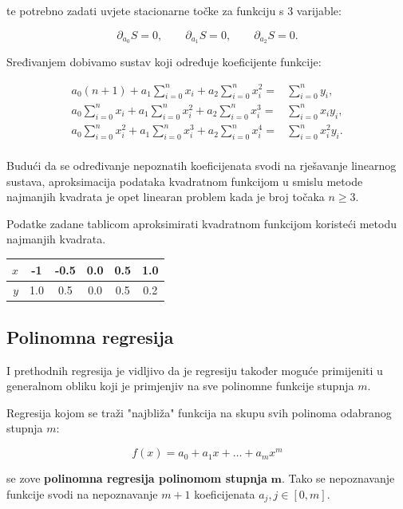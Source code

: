 te potrebno zadati uvjete stacionarne točke za funkciju s 3 varijable:

$$
\partial_{a_0}S=0,\qquad\partial_{a_1}S=0,\qquad\partial_{a_2}S=0.
$$

Sređivanjem dobivamo sustav koji određuje koeficijente funkcije:

\begin{align*}
    a_0(n+1)+a_1\sum_{i=0}^nx_i+a_2\sum_{i=0}^nx_i^2=&\sum_{i=0}^ny_i,\\
    a_0\sum_{i=0}^nx_i+a_1\sum_{i=0}^nx_i^2+a_2\sum_{i=0}^nx_i^3=&\sum_{i=0}^nx_iy_i,\\
    a_0\sum_{i=0}^nx_i^2+a_1\sum_{i=0}^nx_i^3+a_2\sum_{i=0}^nx_i^4=&\sum_{i=0}^nx_i^2y_i.\\
\end{align*}

Budući da se određivanje nepoznatih koeficijenata svodi na rješavanje linearnog sustava, aproksimacija podataka kvadratnom funkcijom u smislu metode najmanjih kvadrata je opet linearan problem kada je broj točaka $n\geq3$.

\begin{example}
    Podatke zadane tablicom aproksimirati kvadratnom funkcijom koristeći metodu najmanjih kvadrata.

    \center
    \begin{tabular}{r|c|c|c|c|c}
        $x$ & -1 & -0.5 & 0.0 & 0.5 & 1.0 \\
        \hline
        $y$ & 1.0 & 0.5 & 0.0 & 0.5 & 0.2 \\
    \end{tabular}
\end{example}

\newpage

\subsection{Polinomna regresija}

I prethodnih regresija je vidljivo da je regresiju također moguće primijeniti u
generalnom obliku koji je primjenjiv na sve polinomne funkcije stupnja $m$.

Regresija kojom se traži "najbliža" funkcija na skupu svih polinoma odabranog
stupnja $m$:

$$
f(x) = a_0+a_1x+\dots+a_mx^m
$$

se zove \textbf{polinomna regresija polinomom stupnja} $\mathbf m$. Tako se
nepoznavanje funkcije svodi na nepoznavanje $m+1$ koeficijenata $a_j,
j\in[0,m]$.

